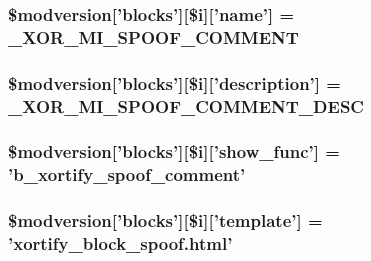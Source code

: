 \hypertarget{xoops__version_8php_a5951d3c081f73a382c5d953f6ab6f946}{
\subsubsection[{\$modversion}]{\setlength{\rightskip}{0pt plus 5cm}\$modversion\mbox{[}'blocks'\mbox{]}\mbox{[}\$i\mbox{]}\mbox{[}'name'\mbox{]} = {\bf \-\_\-\-X\-O\-R\-\_\-\-M\-I\-\_\-\-S\-P\-O\-O\-F\-\_\-\-C\-O\-M\-M\-E\-N\-T}}}\label{xoops__version_8php_a5951d3c081f73a382c5d953f6ab6f946}
\hypertarget{xoops__version_8php_a9a130deea7652d35c9c40af2597342ad}{
\subsubsection[{\$modversion}]{\setlength{\rightskip}{0pt plus 5cm}\$modversion\mbox{[}'blocks'\mbox{]}\mbox{[}\$i\mbox{]}\mbox{[}'description'\mbox{]} = {\bf \-\_\-\-X\-O\-R\-\_\-\-M\-I\-\_\-\-S\-P\-O\-O\-F\-\_\-\-C\-O\-M\-M\-E\-N\-T\-\_\-\-D\-E\-S\-C}}}\label{xoops__version_8php_a9a130deea7652d35c9c40af2597342ad}
\hypertarget{xoops__version_8php_acfb54266647964e7122b4b97d18a7ef2}{
\subsubsection[{\$modversion}]{\setlength{\rightskip}{0pt plus 5cm}\$modversion\mbox{[}'blocks'\mbox{]}\mbox{[}\$i\mbox{]}\mbox{[}'show\-\_\-func'\mbox{]} = '{\bf b\-\_\-xortify\-\_\-spoof\-\_\-comment}'}}\label{xoops__version_8php_acfb54266647964e7122b4b97d18a7ef2}
\hypertarget{xoops__version_8php_a109ef2781ee64346f869b02fe538d208}{
\subsubsection[{\$modversion}]{\setlength{\rightskip}{0pt plus 5cm}\$modversion\mbox{[}'blocks'\mbox{]}\mbox{[}\$i\mbox{]}\mbox{[}'template'\mbox{]} = 'xortify\-\_\-block\-\_\-spoof.\-html'}}\label{xoops__version_8php_a109ef2781ee64346f869b02fe538d208}
